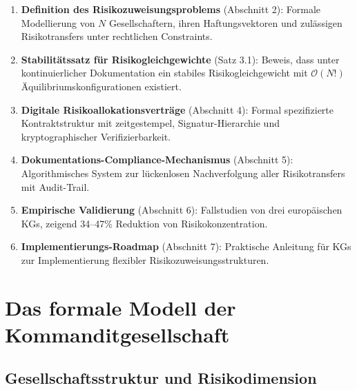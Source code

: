 \documentclass[a4paper,12pt]{article}
\theoremstyle{definition}
\begin{document}
\begin{enumerate}
    \item \textbf{Definition des Risikozuweisungsproblems} (Abschnitt 2): Formale Modellierung von $N$ Gesellschaftern, ihren Haftungsvektoren und zulässigen Risikotransfers unter rechtlichen Constraints.
    
    \item \textbf{Stabilitätssatz für Risikogleichgewichte} (Satz 3.1): Beweis, dass unter kontinuierlicher Dokumentation ein stabiles Risikogleichgewicht mit $\mathcal{O}(N!)$ Äquilibriumskonfigurationen existiert.
    
    \item \textbf{Digitale Risikoallokationsverträge} (Abschnitt 4): Formal spezifizierte Kontraktstruktur mit zeitgestempel, Signatur-Hierarchie und kryptographischer Verifizierbarkeit.
    
    \item \textbf{Dokumentations-Compliance-Mechanismus} (Abschnitt 5): Algorithmisches System zur lückenlosen Nachverfolgung aller Risikotransfers mit Audit-Trail.
    
    \item \textbf{Empirische Validierung} (Abschnitt 6): Fallstudien von drei europäischen KGs, zeigend 34--47\% Reduktion von Risikokonzentration.
    
    \item \textbf{Implementierungs-Roadmap} (Abschnitt 7): Praktische Anleitung für KGs zur Implementierung flexibler Risikozuweisungsstrukturen.
\end{enumerate}

\section{Das formale Modell der Kommanditgesellschaft}

\subsection{Gesellschaftsstruktur und Risikodimension}
\end{document}
